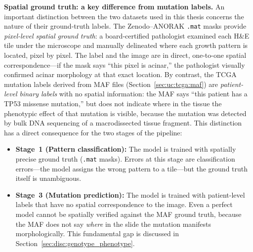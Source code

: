 \textbf{Spatial ground truth: a key difference from mutation labels.}
An important distinction between the two datasets used in this thesis
concerns the nature of their ground-truth labels.
The Zenodo--ANORAK \texttt{.mat} masks provide \emph{pixel-level
spatial ground truth}: a board-certified pathologist examined each
H\&E tile under the microscope and manually delineated where each
growth pattern is located, pixel by pixel.
The label and the image are in direct, one-to-one spatial
correspondence---if the mask says ``this pixel is acinar,'' the
pathologist visually confirmed acinar morphology at that exact location.
By contrast, the TCGA mutation labels derived from MAF files
(Section~\ref{sec:uc:tcga:maf}) are \emph{patient-level binary labels}
with no spatial information: the MAF says ``this patient has a TP53
missense mutation,'' but does not indicate where in the tissue the
phenotypic effect of that mutation is visible, because the mutation
was detected by bulk DNA sequencing of a macrodissected tissue fragment.
This distinction has a direct consequence for the two stages of the
pipeline:
\begin{itemize}
    \item \textbf{Stage~1 (Pattern classification):}
    The model is trained with spatially precise ground truth
    (\texttt{.mat} masks).
    Errors at this stage are classification errors---the model assigns
    the wrong pattern to a tile---but the ground truth itself is
    unambiguous.
    \item \textbf{Stage~3 (Mutation prediction):}
    The model is trained with patient-level labels that have no spatial
    correspondence to the image.
    Even a perfect model cannot be spatially verified against the MAF
    ground truth, because the MAF does not say \emph{where} in the
    slide the mutation manifests morphologically.
    This fundamental gap is discussed in
    Section~\ref{sec:disc:genotype_phenotype}.
\end{itemize}

